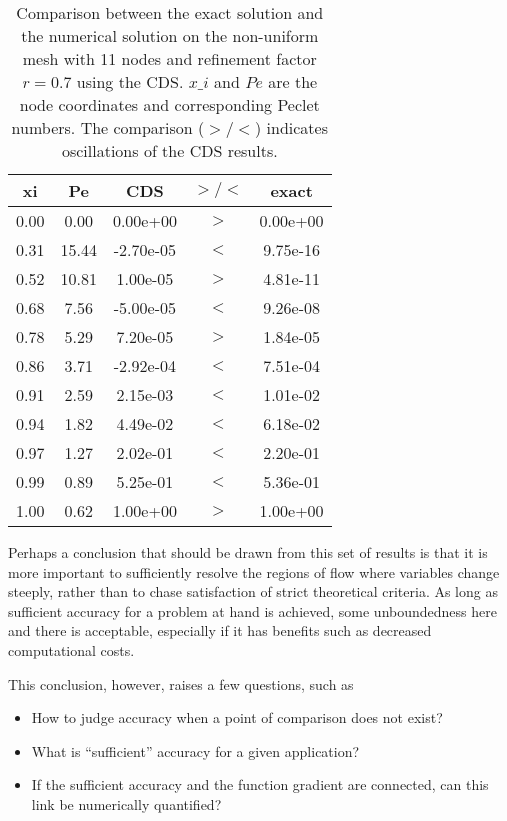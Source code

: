 \documentclass[12pt]{article}
\begin{document}
\begin{table}
    \centering
    \caption{Comparison between the exact solution and the numerical solution on the non-uniform mesh with 11 nodes and refinement factor $r = 0.7$ using the CDS. $x\_i$ and $Pe$ are the node coordinates and corresponding Peclet numbers. The comparison ($>/<$) indicates oscillations of the CDS results.}
    \label{tab:my-table}
    \begin{tabular}{ccccc}
    \textbf{xi} & \textbf{Pe} & \textbf{CDS} & \textbf{$>/<$} & \textbf{exact} \\
    \hline
    0.00 &  0.00 &  0.00e+00 & $>$ & 0.00e+00 \\
    0.31 & 15.44 & -2.70e-05 & $<$ & 9.75e-16 \\
    0.52 & 10.81 &  1.00e-05 & $>$ & 4.81e-11 \\
    0.68 &  7.56 & -5.00e-05 & $<$ & 9.26e-08 \\
    0.78 &  5.29 &  7.20e-05 & $>$ & 1.84e-05 \\
    0.86 &  3.71 & -2.92e-04 & $<$ & 7.51e-04 \\
    0.91 &  2.59 &  2.15e-03 & $<$ & 1.01e-02 \\
    0.94 &  1.82 &  4.49e-02 & $<$ & 6.18e-02 \\
    0.97 &  1.27 &  2.02e-01 & $<$ & 2.20e-01 \\
    0.99 &  0.89 &  5.25e-01 & $<$ & 5.36e-01 \\
    1.00 &  0.62 &  1.00e+00 & $>$ & 1.00e+00
    \end{tabular}
\end{table}

Perhaps a conclusion that should be drawn from this set of results is that it is more important to sufficiently resolve the regions of flow where variables change steeply, rather than to chase satisfaction of strict theoretical criteria. As long as sufficient accuracy for a problem at hand is achieved, some unboundedness here and there is acceptable, especially if it has benefits such as decreased computational costs.

This conclusion, however, raises a few questions, such as

\begin{itemize}
    \item How to judge accuracy when a point of comparison does not exist?
    \item What is ``sufficient'' accuracy for a given application?
    \item If the sufficient accuracy and the function gradient are connected, can this link be numerically quantified?
\end{itemize}
\end{document}
